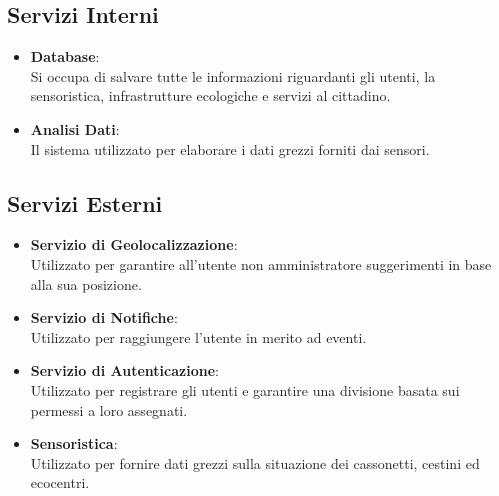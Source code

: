 \subsection{Servizi Interni}
    \begin{itemize}
        \item \textbf{Database}: \\ Si occupa di salvare tutte le informazioni riguardanti gli utenti, la sensoristica, infrastrutture ecologiche e servizi al cittadino.
        \item \textbf{Analisi Dati}: \\ Il sistema utilizzato per elaborare i dati grezzi forniti dai sensori.
    \end{itemize}

\subsection{Servizi Esterni}
    \begin{itemize}
        \item \textbf{Servizio di Geolocalizzazione}: \\ Utilizzato per garantire all'utente non amministratore suggerimenti in base alla sua posizione.
        \item \textbf{Servizio di Notifiche}: \\ Utilizzato per raggiungere l'utente in merito ad eventi.
        \item \textbf{Servizio di Autenticazione}: \\ Utilizzato per registrare gli utenti e garantire una divisione basata sui permessi a loro assegnati.
        \item \textbf{Sensoristica}:\\ Utilizzato per fornire dati grezzi sulla situazione dei cassonetti, cestini ed ecocentri.
    \end{itemize}